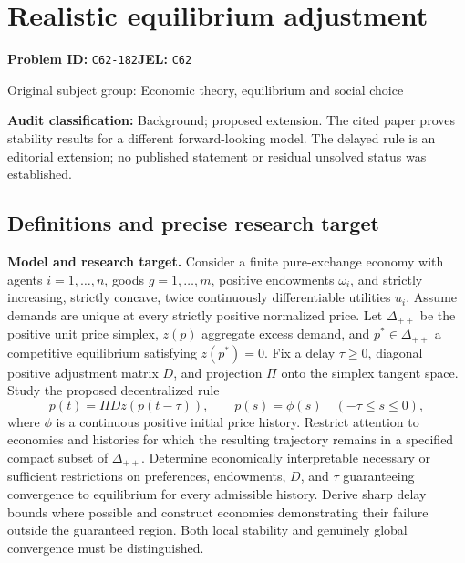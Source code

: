 \documentclass[11pt,a4paper]{article}
\begin{document}
\section*{Realistic equilibrium adjustment}
\textbf{Problem ID:} \texttt{C62-182}\quad \textbf{JEL:} \texttt{C62}\par
\label{problem:OP-0271}
{\sffamily\small\color{muted}Original subject group: Economic theory, equilibrium and social choice\par}
\label{definitions:problem:30007552}
\textbf{Audit classification:} Background; proposed extension. The cited paper proves stability results for a different forward-looking model. The delayed rule is an editorial extension; no published statement or residual unsolved status was established.
\subsection*{Definitions and precise research target}
\textbf{Model and research target.} Consider a finite pure-exchange economy with agents \(i=1,\ldots,n\), goods \(g=1,\ldots,m\), positive endowments \(\omega_i\), and strictly increasing, strictly concave, twice continuously differentiable utilities \(u_i\). Assume demands are unique at every strictly positive normalized price. Let \(\Delta_{++}\) be the positive unit price simplex, \(z(p)\) aggregate excess demand, and \(p^*\in\Delta_{++}\) a competitive equilibrium satisfying \(z(p^*)=0\). Fix a delay \(\tau\geq0\), diagonal positive adjustment matrix \(D\), and projection \(\Pi\) onto the simplex tangent space. Study the proposed decentralized rule
\[
 \dot p(t)=\Pi D z(p(t-\tau)),\qquad p(s)=\phi(s)\quad(-\tau\leq s\leq0),
\]
where \(\phi\) is a continuous positive initial price history. Restrict attention to economies and histories for which the resulting trajectory remains in a specified compact subset of \(\Delta_{++}\). Determine economically interpretable necessary or sufficient restrictions on preferences, endowments, \(D\), and \(\tau\) guaranteeing convergence to equilibrium for every admissible history. Derive sharp delay bounds where possible and construct economies demonstrating their failure outside the guaranteed region. Both local stability and genuinely global convergence must be distinguished.
\end{document}
